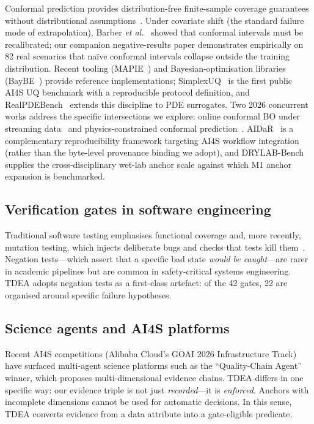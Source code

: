 \documentclass[review,3p]{elsarticle}
\begin{document}
Conformal prediction provides distribution-free finite-sample coverage guarantees without distributional assumptions~\cite{angelopoulos2021test,lei2018distribution}. Under covariate shift (the standard failure mode of extrapolation), Barber \emph{et al.}~\cite{barber2023conformal} showed that conformal intervals must be recalibrated; our companion negative-results paper demonstrates empirically on 82 real scenarios that na\"ive conformal intervals collapse outside the training distribution. Recent tooling (MAPIE~\cite{papadopoulos2024mapie}) and Bayesian-optimisation libraries (BayBE~\cite{sehnal2021baybe}) provide reference implementations; SimplexUQ~\cite{simplexuq2026} is the first public AI4S UQ benchmark with a reproducible protocol definition, and RealPDEBench~\cite{realpdebench2026} extends this discipline to PDE surrogates. Two 2026 concurrent works address the specific intersections we explore: online conformal BO under streaming data~\cite{onlineconfbo2026} and physics-constrained conformal prediction~\cite{physconf2026}. AIDaR~\cite{aidar2026} is a complementary reproducibility framework targeting AI4S workflow integration (rather than the byte-level provenance binding we adopt), and DRYLAB-Bench~\cite{drylabbench2026} supplies the cross-disciplinary wet-lab anchor scale against which M1 anchor expansion is benchmarked.

\subsection{Verification gates in software engineering}

Traditional software testing emphasises functional coverage and, more recently, mutation testing, which injects deliberate bugs and checks that tests kill them~\cite{hartmann2009mutation}. Negation tests---which assert that a specific bad state \emph{would be caught}---are rarer in academic pipelines but are common in safety-critical systems engineering. TDEA adopts negation tests as a first-class artefact: of the 42 gates, 22 are organised around specific failure hypotheses.

\subsection{Science agents and AI4S platforms}

Recent AI4S competitions (Alibaba Cloud's GOAI 2026 Infrastructure Track) have surfaced multi-agent science platforms such as the ``Quality-Chain Agent'' winner, which proposes multi-dimensional evidence chains. TDEA differs in one specific way: our evidence triple is not just \emph{recorded}---it is \emph{enforced}. Anchors with incomplete dimensions cannot be used for automatic decisions. In this sense, TDEA converts evidence from a data attribute into a gate-eligible predicate.
\end{document}
